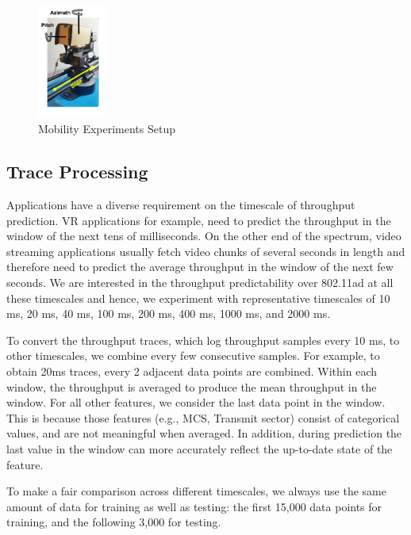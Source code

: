 \documentclass[sigconf,anonymous]{acmart}
\begin{document}

\begin{figure}[t]
    \centering
    \includegraphics[width=0.2\textwidth]{setup.png}
    \caption{Mobility Experiments Setup}
    \label{fig:setup}
\end{figure}

\subsection{Trace Processing}

Applications have a diverse requirement on the timescale of throughput prediction. VR applications for example, need to predict the throughput in the window of the next tens of milliseconds. On the other end of the spectrum, video streaming applications usually fetch video chunks of several seconds in length and therefore need to predict the average throughput in the window of the next few seconds. We are interested in the throughput predictability over 802.11ad at all these timescales and hence, we experiment with representative timescales of 10 ms, 20 ms, 40 ms, 100 ms, 200 ms, 400 ms, 1000 ms, and 2000 ms.

To convert the throughput traces, which log throughput samples every 10 ms, to other timescales, we combine every few consecutive samples. For example, to obtain 20ms traces, every 2 adjacent data points are combined. Within each window, the throughput is averaged to produce the mean throughput in the window. For all other features, we consider the last data point in the window. This is because those features (e.g., MCS, Transmit sector) consist of categorical values, and are not meaningful when averaged. In addition, during prediction the last value in the window can more accurately reflect the up-to-date state of the feature.

To make a fair comparison across different timescales, we always use the same amount of data for training as well as testing: the first 15,000 data points for training, and the following 3,000 for testing.
\end{document}
